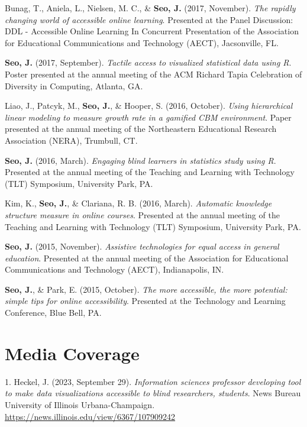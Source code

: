 \documentclass[11pt,a4paper,]{awesome-cv}
\begin{document}
Bunag, T., Aniela, L., Nielsen, M. C., \& \textbf{Seo, J.} (2017,
November). \emph{The rapidly changing world of accessible online
learning}. Presented at the Panel Discussion: DDL - Accessible Online
Learning In Concurrent Presentation of the Association for Educational
Communications and Technology (AECT), Jacsonville, FL.

\textbf{Seo, J.} (2017, September). \emph{Tactile access to visualized
statistical data using R}. Poster presented at the annual meeting of the
ACM Richard Tapia Celebration of Diversity in Computing, Atlanta, GA.

Liao, J., Patcyk, M., \textbf{Seo, J.}, \& Hooper, S. (2016, October).
\emph{Using hierarchical linear modeling to measure growth rate in a
gamified CBM environment}. Paper presented at the annual meeting of the
Northeastern Educational Research Association (NERA), Trumbull, CT.

\textbf{Seo, J.} (2016, March). \emph{Engaging blind learners in
statistics study using R}. Presented at the annual meeting of the
Teaching and Learning with Technology (TLT) Symposium, University Park,
PA.

Kim, K., \textbf{Seo, J.}, \& Clariana, R. B. (2016, March).
\emph{Automatic knowledge structure measure in online courses}.
Presented at the annual meeting of the Teaching and Learning with
Technology (TLT) Symposium, University Park, PA.

\textbf{Seo, J.} (2015, November). \emph{Assistive technologies for
equal access in general education}. Presented at the annual meeting of
the Association for Educational Communications and Technology (AECT),
Indianapolis, IN.

\textbf{Seo, J.}, \& Park, E. (2015, October). \emph{The more
accessible, the more potential: simple tips for online accessibility}.
Presented at the Technology and Learning Conference, Blue Bell, PA.

\hypertarget{media-coverage}{%
\section{Media Coverage}\label{media-coverage}}

\hypertarget{bibliography}{}
\leavevmode\hypertarget{ref-heckelInformationSciencesProfessora}{}%
1. Heckel, J. (2023, September 29). \emph{Information sciences professor
developing tool to make data visualizations accessible to blind
researchers, students}. News Bureau University of Illinois
Urbana-Champaign. \url{https://news.illinois.edu/view/6367/107909242}
\end{document}
